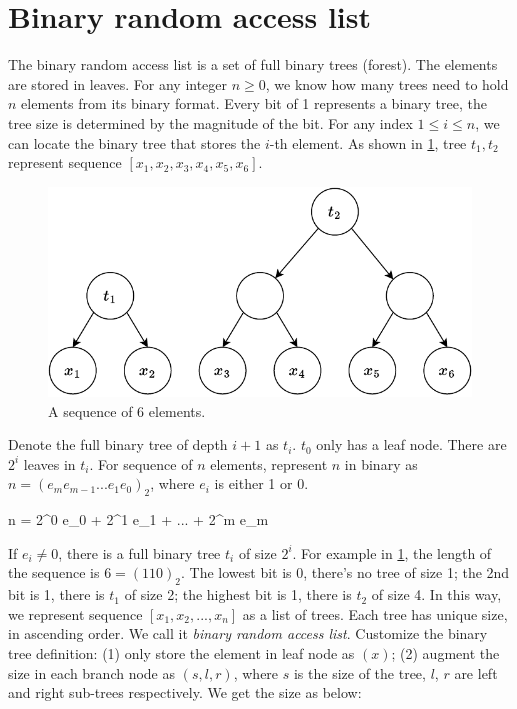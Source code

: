 \documentclass[b5paper]{article}
\begin{document}
\section{Binary random access list}

The binary random access list is a set of full binary trees (forest). The elements are stored in leaves. For any integer $n \geq 0$, we know how many trees need to hold $n$ elements from its binary format. Every bit of 1 represents a binary tree, the tree size is determined by the magnitude of the bit. For any index $1 \leq i \leq n$, we can locate the binary tree that stores the $i$-th element. As shown in \cref{fig:bi-tree-sequence}, tree $t_1, t_2$ represent sequence $[x_1, x_2, x_3, x_4, x_5, x_6]$.

\begin{figure}[htbp]
  \centering
  \includegraphics[scale=0.6]{img/bi-tree-sequence}
  \caption{A sequence of 6 elements.}
  \label{fig:bi-tree-sequence}
\end{figure}

Denote the full binary tree of depth $i + 1$ as $t_i$. $t_0$ only has a leaf node. There are $2^i$ leaves in $t_i$. For sequence of $n$ elements, represent $n$ in binary as $n = (e_m e_{m-1} ... e_1 e_0)_2$, where $e_i$ is either 1 or 0.

\be
n = 2^0 e_0 + 2^1 e_1 + ... + 2^m e_m
\ee

If $e_i \neq 0$, there is a full binary tree $t_i$ of size $2^i$. For example in \cref{fig:bi-tree-sequence}, the length of the sequence is $6 = (110)_2$. The lowest bit is 0, there's no tree of size 1; the 2nd bit is 1, there is $t_1$ of size 2; the highest bit is 1, there is $t_2$ of size 4. In this way, we represent sequence $[x_1, x_2, ..., x_n]$ as a list of trees. Each tree has unique size, in ascending order. We call it {\em binary random access list}\cite{okasaki-book}. Customize the binary tree definition: (1) only store the element in leaf node as $(x)$; (2) augment the size in each branch node as $(s, l, r)$, where $s$ is the size of the tree, $l$, $r$ are left and right sub-trees respectively. We get the size as below:
\end{document}
